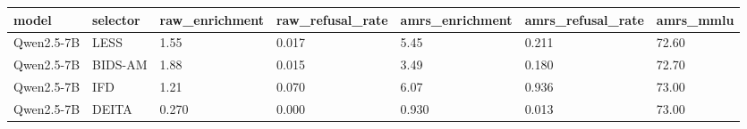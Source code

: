 \begin{tabular}{lllllll}
\toprule
model & selector & raw\_enrichment & raw\_refusal\_rate & amrs\_enrichment & amrs\_refusal\_rate & amrs\_mmlu \\
\midrule
Qwen2.5-7B & LESS & 1.55 & 0.017 & 5.45 & 0.211 & 72.60 \\
Qwen2.5-7B & BIDS-AM & 1.88 & 0.015 & 3.49 & 0.180 & 72.70 \\
Qwen2.5-7B & IFD & 1.21 & 0.070 & 6.07 & 0.936 & 73.00 \\
Qwen2.5-7B & DEITA & 0.270 & 0.000 & 0.930 & 0.013 & 73.00 \\
\bottomrule
\end{tabular}
